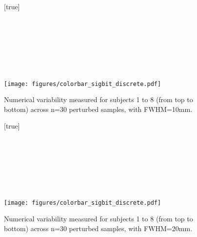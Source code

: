 \documentclass[lettersize,journal]{IEEEtran}
\begin{document}
\begin{landscape}
  \begin{figure}
    \vspace*{-2cm}
    \centering
    [true] \\
     \\
     \\
     \\
     \\
     \\
     \\
     \\
    \texttt{[image: figures/colorbar\_sigbit\_discrete.pdf]}
    \caption{Numerical variability measured for subjects 1 to 8 (from top to bottom) across n=30 perturbed samples, with FWHM=10mm. }
    \label{fig:uncertainty-maps-10mm-disc}
  \end{figure}
\end{landscape}

\begin{landscape}
  \begin{figure}
    \vspace*{-2cm}
    \centering
    [true] \\
     \\
     \\
     \\
     \\
     \\
     \\
     \\
    \texttt{[image: figures/colorbar\_sigbit\_discrete.pdf]}
    \caption{Numerical variability measured for subjects 1 to 8 (from top to bottom) across n=30 perturbed samples, with FWHM=20mm. }
    \label{fig:uncertainty-maps-20mm-disc}
  \end{figure}
\end{landscape}
\end{document}
